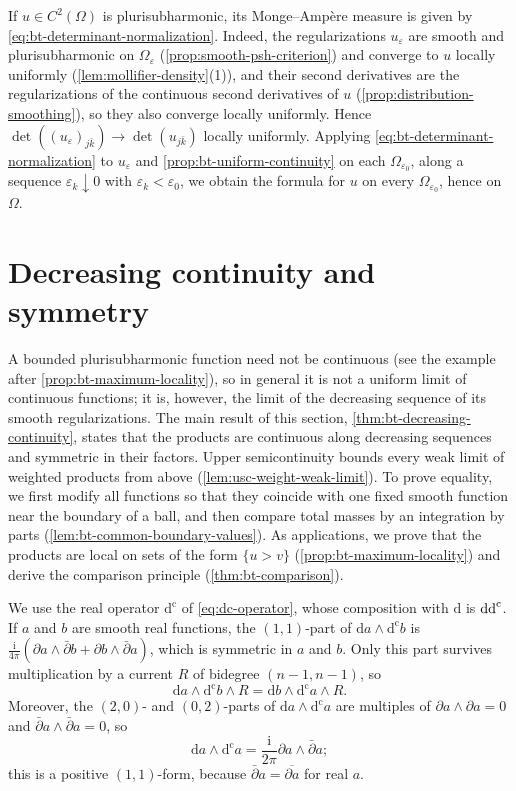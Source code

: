 If $u\in C^2(\Omega)$ is plurisubharmonic, its Monge--Amp\`ere measure is given by \eqref{eq:bt-determinant-normalization}. Indeed, the regularizations $u_\varepsilon$ are smooth and plurisubharmonic on $\Omega_\varepsilon$ (\cref{prop:smooth-psh-criterion}) and converge to $u$ locally uniformly (\cref{lem:mollifier-density}(1)), and their second derivatives are the regularizations of the continuous second derivatives of $u$ (\cref{prop:distribution-smoothing}), so they also converge locally uniformly. Hence $\det((u_\varepsilon)_{j\bar k})\to\det(u_{j\bar k})$ locally uniformly. Applying \eqref{eq:bt-determinant-normalization} to $u_\varepsilon$ and \cref{prop:bt-uniform-continuity} on each $\Omega_{\varepsilon_0}$, along a sequence $\varepsilon_k\downarrow0$ with $\varepsilon_k<\varepsilon_0$, we obtain the formula for $u$ on every $\Omega_{\varepsilon_0}$, hence on $\Omega$.

\section{Decreasing continuity and symmetry}
\label{sec:bt-monotone}

A bounded plurisubharmonic function need not be continuous (see the example after \cref{prop:bt-maximum-locality}), so in general it is not a uniform limit of continuous functions; it is, however, the limit of the decreasing sequence of its smooth regularizations. The main result of this section, \cref{thm:bt-decreasing-continuity}, states that the products are continuous along decreasing sequences and symmetric in their factors. Upper semicontinuity bounds every weak limit of weighted products from above (\cref{lem:usc-weight-weak-limit}). To prove equality, we first modify all functions so that they coincide with one fixed smooth function near the boundary of a ball, and then compare total masses by an integration by parts (\cref{lem:bt-common-boundary-values}). As applications, we prove that the products are local on sets of the form $\{u>v\}$ (\cref{prop:bt-maximum-locality}) and derive the comparison principle (\cref{thm:bt-comparison}).

We use the real operator $\mathrm{d}^{\mathrm c}$ of \eqref{eq:dc-operator}, whose composition with $\mathrm d$ is $\mathrm{dd}^{\mathrm{c}}$. If $a$ and $b$ are smooth real functions, the $(1,1)$-part of $\mathrm{d}a\wedge\mathrm{d}^{\mathrm c}b$ is $\frac{\mathrm{i}}{4\pi}(\partial a\wedge\bar\partial b+\partial b\wedge\bar\partial a)$, which is symmetric in $a$ and $b$. Only this part survives multiplication by a current $R$ of bidegree $(n-1,n-1)$, so
\[
 \mathrm{d}a\wedge\mathrm{d}^{\mathrm c}b\wedge R=\mathrm{d}b\wedge\mathrm{d}^{\mathrm c}a\wedge R.
\]
Moreover, the $(2,0)$- and $(0,2)$-parts of $\mathrm{d}a\wedge\mathrm{d}^{\mathrm c}a$ are multiples of $\partial a\wedge\partial a=0$ and $\bar\partial a\wedge\bar\partial a=0$, so
\begin{equation}\label{eq:bt-gradient-form}
 \mathrm{d}a\wedge\mathrm{d}^{\mathrm c}a=\frac{\mathrm{i}}{2\pi}\partial a\wedge\bar\partial a;
\end{equation}
this is a positive $(1,1)$-form, because $\bar\partial a=\overline{\partial a}$ for real $a$.


